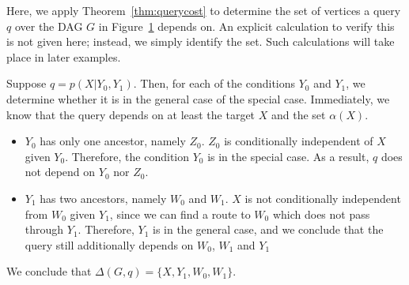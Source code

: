 \begin{example} Here, we apply Theorem~\ref{thm:querycost} to determine the set of vertices a query $q$ over the DAG $G$ in Figure~\ref{fig:querydependentex} depends on. An explicit calculation to verify this is not given here; instead, we simply identify the set. Such calculations will take place in later examples. \newline


 \begin{figure}[h!]
\centering
\begin{center}
\end{center}
\caption{}
\label{fig:querydependentex}
\end{figure}

Suppose $q = p(X|Y_{0},Y_{1})$. Then, for each of the conditions $Y_{0}$ and $Y_{1}$, we determine whether it is in the general case of the special case. Immediately, we know that the query depends on at least the target $X$ and the set $\alpha(X)$. 
\begin{itemize}
\item $Y_{0}$ has only one ancestor, namely $Z_{0}$. $Z_{0}$ is conditionally independent of $X$ given $Y_{0}$. Therefore, the condition $Y_{0}$ is in the special case. As a result, $q$ does not depend on $Y_{0}$ nor $Z_{0}$. 
\item $Y_{1}$ has two ancestors, namely $W_{0}$ and $W_{1}$. $X$ is not conditionally independent from $W_{0}$ given $Y_{1}$, since we can find a route to $W_{0}$ which does not pass through $Y_{1}$. Therefore, $Y_{1}$ is in the general case, and we conclude that the query still additionally depends on $W_{0}$, $W_{1}$ and $Y_{1}$
\end{itemize}
We conclude that $\Delta(G,q) = \{X, Y_{1}, W_{0}, W_{1}\}$.  
\end{example}


